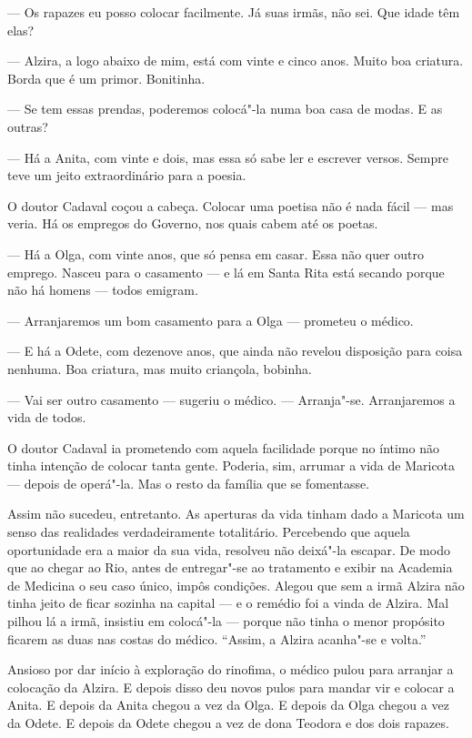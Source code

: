 --- Os rapazes eu posso colocar facilmente. Já suas irmãs, não sei. Que
idade têm elas?

--- Alzira, a logo abaixo de mim, está com vinte e cinco anos. Muito boa
criatura. Borda que é um primor. Bonitinha.

--- Se tem essas prendas, poderemos colocá"-la numa boa casa de modas. E
as outras?

--- Há a Anita, com vinte e dois, mas essa só sabe ler e escrever
versos. Sempre teve um jeito extraordinário para a poesia.

O doutor Cadaval coçou a cabeça. Colocar uma poetisa não é nada fácil
--- mas veria. Há os empregos do Governo, nos quais cabem até os poetas.

--- Há a Olga, com vinte anos, que só pensa em casar. Essa não quer
outro emprego. Nasceu para o casamento --- e lá em Santa Rita está
secando porque não há homens --- todos emigram.

--- Arranjaremos um bom casamento para a Olga --- prometeu o médico.

--- E há a Odete, com dezenove anos, que ainda não revelou disposição
para coisa nenhuma. Boa criatura, mas muito criançola, bobinha.

--- Vai ser outro casamento --- sugeriu o médico. --- Arranja"-se.
Arranjaremos a vida de todos.

O doutor Cadaval ia prometendo com aquela facilidade porque no íntimo
não tinha intenção de colocar tanta gente. Poderia, sim, arrumar a vida
de Maricota --- depois de operá"-la. Mas o resto da família que se
fomentasse.

Assim não sucedeu, entretanto. As aperturas da vida tinham dado a
Maricota um senso das realidades verdadeiramente totalitário. Percebendo
que aquela oportunidade era a maior da sua vida, resolveu não deixá"-la
escapar. De modo que ao chegar ao Rio, antes de entregar"-se ao
tratamento e exibir na Academia de Medicina o seu caso único, impôs
condições. Alegou que sem a irmã Alzira não tinha jeito de ficar sozinha
na capital --- e o remédio foi a vinda de Alzira. Mal pilhou lá a irmã,
insistiu em colocá"-la --- porque não tinha o menor propósito ficarem as
duas nas costas do médico. ``Assim, a Alzira acanha"-se e volta.''

Ansioso por dar início à exploração do rinofima, o médico pulou para
arranjar a colocação da Alzira. E depois disso deu novos pulos para
mandar vir e colocar a Anita. E depois da Anita chegou a vez da Olga. E
depois da Olga chegou a vez da Odete. E depois da Odete chegou a vez de
dona Teodora e dos dois rapazes.

